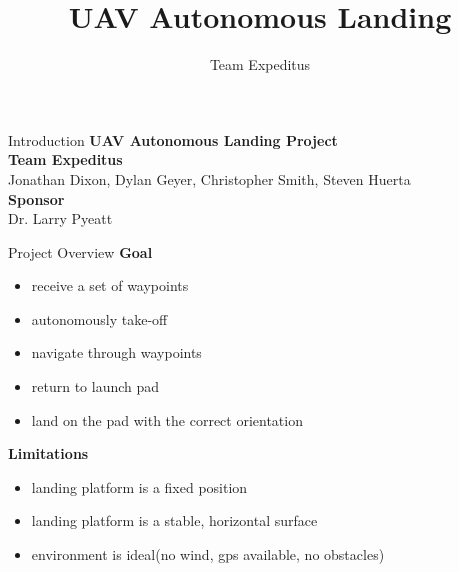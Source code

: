 \documentclass[11pt]{beamer}
\author{Team Expeditus}
\title{UAV Autonomous Landing}
\institute{SDSMT MCS}
\begin{document}
\begin{frame}
\titlepage
\end{frame}


\begin{frame}{Introduction}
\textbf{UAV Autonomous Landing Project}\\
\vspace{12mm}
\textbf{Team Expeditus}\\
Jonathan Dixon, Dylan Geyer, Christopher Smith, Steven Huerta\\ 
\vspace{6mm}
\textbf{Sponsor}\\
Dr. Larry Pyeatt\\
\end{frame}

\begin{frame}{Project Overview}
\textbf{Goal}\\
\begin{itemize}
\item receive a set of waypoints
\item autonomously take-off
\item navigate through waypoints
\item return to launch pad
\item land on the pad with the correct orientation
\end{itemize}
\vspace{6mm}
\textbf{Limitations}\\
\begin{itemize}
\item landing platform is a fixed position
\item landing platform is a stable, horizontal surface
\item environment is ideal(no wind, gps available, no obstacles)
\end{itemize}
\end{frame}
\end{document}
